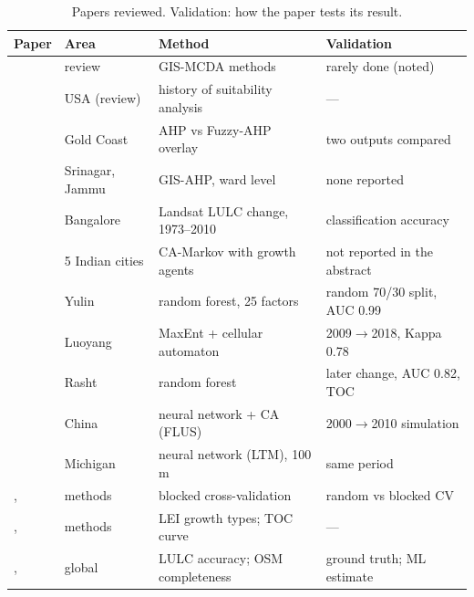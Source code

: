 \begin{table}[ht]
  \centering\small
  \caption{Papers reviewed. Validation: how the paper tests its result.}
  \label{tab:literature}
  \begin{tabularx}{\textwidth}{@{}l l X X@{}}
    \toprule
    Paper & Area & Method & Validation \\
    \midrule
    \citet{malczewski2004} & review & GIS-MCDA methods & rarely done (noted) \\
    \citet{collins2001} & USA (review) & history of suitability analysis & --- \\
    \citet{mosadeghi2015} & Gold Coast & AHP vs Fuzzy-AHP overlay & two outputs compared \\
    \citet{parry2018} & Srinagar, Jammu & GIS-AHP, ward level & none reported \\
    \citet{ramachandra2012} & Bangalore & Landsat LULC change, 1973--2010 & classification accuracy \\
    \citet{bharath2018} & 5 Indian cities & CA-Markov with growth agents & not reported in the abstract \\
    \citet{li2024} & Yulin & random forest, 25 factors & random 70/30 split, AUC 0.99 \\
    \citet{wang2021} & Luoyang & MaxEnt + cellular automaton & 2009$\to$2018, Kappa 0.78 \\
    \citet{ahmadlou2016} & Rasht & random forest & later change, AUC 0.82, TOC \\
    \citet{liu2017flus} & China & neural network + CA (FLUS) & 2000$\to$2010 simulation \\
    \citet{pijanowski2002} & Michigan & neural network (LTM), 100\,m & same period \\
    \citet{roberts2017}, \citet{ploton2020} & methods & blocked cross-validation & random vs blocked CV \\
    \citet{liu2010lei}, \citet{pontius2014} & methods & LEI growth types; TOC curve & --- \\
    \citet{venter2022}, \citet{herfort2023} & global & LULC accuracy; OSM completeness & ground truth; ML estimate \\
    \bottomrule
  \end{tabularx}
\end{table}
